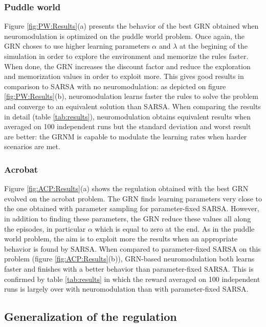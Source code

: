 \subsubsection{Puddle world}
Figure \ref{fig:PW:Results}(a) presents the behavior of the best GRN obtained when neuromodulation is optimized on the puddle world problem. Once again, the GRN choses to use higher learning parameters $\alpha$ and $\lambda$ at the begining of the simulation in order to explore the environment and memorize the rules faster. When done, the GRN increases the discount factor and reduce the exploration and memorization values in order to exploit more. This gives good results in comparison to SARSA with no neuromodulation: as depicted on figure \ref{fig:PW:Results}(b), neuromodulation learns faster the rules to solve the problem and converge to an equivalent solution than SARSA. When comparing the results in detail (table \ref{tab:results}), neuromodulation obtains equivalent results when averaged on 100 independent runs but the standard deviation and worst result are better: the GRNM is capable to modulate the learning rates when harder scenarios are met. 

\subsubsection{Acrobat}

Figure \ref{fig:ACP:Results}(a) shows the regulation obtained with the best GRN evolved on the acrobat problem. The GRN finds learning parameters very close to the one obtained with parameter sampling for parameter-fixed SARSA. However, in addition to finding these parameters, the GRN reduce these values all along the episodes, in particular $\alpha$ which is equal to zero at the end. As in the puddle world problem, the aim is to exploit more the results when an appropriate behavior is found by SARSA. When compared to parameter-fixed SARSA on this problem (figure \ref{fig:ACP:Results}(b)), GRN-based neuromodulation both learns faster and finishes with a better behavior than parameter-fixed SARSA. This is confirmed by table \ref{tab:results} in which the reward averaged on 100 independent runs is largely over with neuromodulation than with parameter-fixed SARSA. 

\subsection{Generalization of the regulation}
